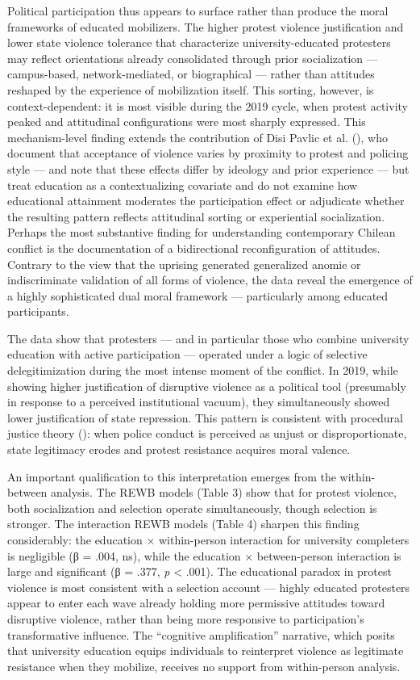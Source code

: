 \documentclass[
  13pt,
]{article}
\begin{document}
Political participation thus appears to surface rather than produce the
moral frameworks of educated mobilizers. The higher protest violence
justification and lower state violence tolerance that characterize
university-educated protesters may reflect orientations already
consolidated through prior socialization --- campus-based,
network-mediated, or biographical --- rather than attitudes reshaped by
the experience of mobilization itself. This sorting, however, is
context-dependent: it is most visible during the 2019 cycle, when
protest activity peaked and attitudinal configurations were most sharply
expressed. This mechanism-level finding extends the contribution of Disi
Pavlic et al. (), who
document that acceptance of violence varies by proximity to protest and
policing style --- and note that these effects differ by ideology and
prior experience --- but treat education as a contextualizing covariate
and do not examine how educational attainment moderates the
participation effect or adjudicate whether the resulting pattern
reflects attitudinal sorting or experiential socialization. Perhaps the
most substantive finding for understanding contemporary Chilean conflict
is the documentation of a bidirectional reconfiguration of attitudes.
Contrary to the view that the uprising generated generalized anomie or
indiscriminate validation of all forms of violence, the data reveal the
emergence of a highly sophisticated dual moral framework ---
particularly among educated participants.

The data show that protesters --- and in particular those who combine
university education with active participation --- operated under a
logic of selective delegitimization during the most intense moment of
the conflict. In 2019, while showing higher justification of disruptive
violence as a political tool (presumably in response to a perceived
institutional vacuum), they simultaneously showed lower justification of
state repression. This pattern is consistent with procedural justice
theory (): when police
conduct is perceived as unjust or disproportionate, state legitimacy
erodes and protest resistance acquires moral valence.

An important qualification to this interpretation emerges from the
within-between analysis. The REWB models (Table 3) show that for protest
violence, both socialization and selection operate simultaneously,
though selection is stronger. The interaction REWB models (Table 4)
sharpen this finding considerably: the education × within-person
interaction for university completers is negligible (β = .004, ns),
while the education × between-person interaction is large and
significant (β = .377, \emph{p} \textless{} .001). The educational
paradox in protest violence is most consistent with a selection account
--- highly educated protesters appear to enter each wave already holding
more permissive attitudes toward disruptive violence, rather than being
more responsive to participation's transformative influence. The
``cognitive amplification'' narrative, which posits that university
education equips individuals to reinterpret violence as legitimate
resistance when they mobilize, receives no support from within-person
analysis.
\end{document}
